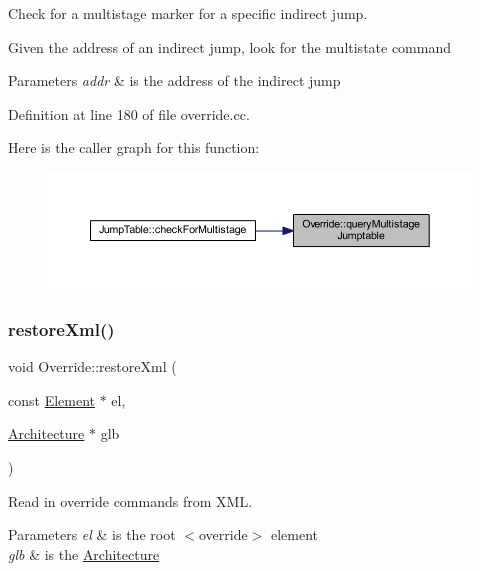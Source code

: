 Check for a multistage marker for a specific indirect jump. 

Given the address of an indirect jump, look for the multistate command 
\begin{DoxyParams}{Parameters}
{\em addr} & is the address of the indirect jump \\
\hline
\end{DoxyParams}


Definition at line 180 of file override.\+cc.

Here is the caller graph for this function\+:
\nopagebreak
\begin{figure}[H]
\begin{center}
\leavevmode
\includegraphics[width=350pt]{class_override_a49748ed2ed69fc5be1baf9921d8f7028_icgraph}
\end{center}
\end{figure}
\mbox{\label{class_override_a81f34dfc11c427ea0873358bef93ada3}} 
\subsubsection{\texorpdfstring{restoreXml()}{restoreXml()}}
{\footnotesize\ttfamily void Override\+::restore\+Xml (\begin{DoxyParamCaption}\item[{const \mbox{\hyperlink{class_element}{Element}} $\ast$}]{el,  }\item[{\mbox{\hyperlink{class_architecture}{Architecture}} $\ast$}]{glb }\end{DoxyParamCaption})}



Read in override commands from X\+ML. 


\begin{DoxyParams}{Parameters}
{\em el} & is the root $<$override$>$ element \\
\hline
{\em glb} & is the \mbox{\hyperlink{class_architecture}{Architecture}} \\
\hline
\end{DoxyParams}


